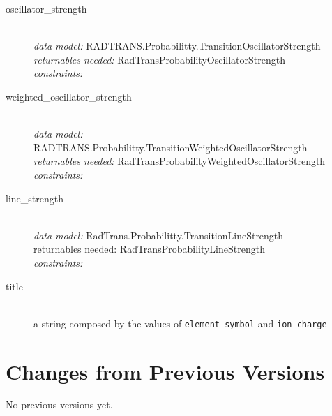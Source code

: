 \documentclass[11pt,a4paper]{ivoa}
\begin{document}
\begin{description}
\item [oscillator\_strength]\hfill\\
	\textit{data model:}  RADTRANS.Probabilitty.TransitionOscillatorStrength\\
	\textit{returnables needed:} RadTransProbabilityOscillatorStrength\\
         \textit{constraints:} 

\item [weighted\_oscillator\_strength]\hfill\\
	\textit{data model:}  RADTRANS.Probabilitty.TransitionWeightedOscillatorStrength\\
	\textit{returnables needed:} RadTransProbabilityWeightedOscillatorStrength\\
         \textit{constraints:} 

\item [line\_strength]\hfill\\
	\textit{data model:} RadTrans.Probabilitty.TransitionLineStrength\\
	returnables needed: RadTransProbabilityLineStrength\\
         \textit{constraints:} 	
         
\item [title]\hfill\\
	a string composed by the values of  \texttt{element\_symbol} and \texttt{ion\_charge}
	

\end{description}

\appendix
\section{Changes from Previous Versions}

No previous versions yet.  



\end{document}
